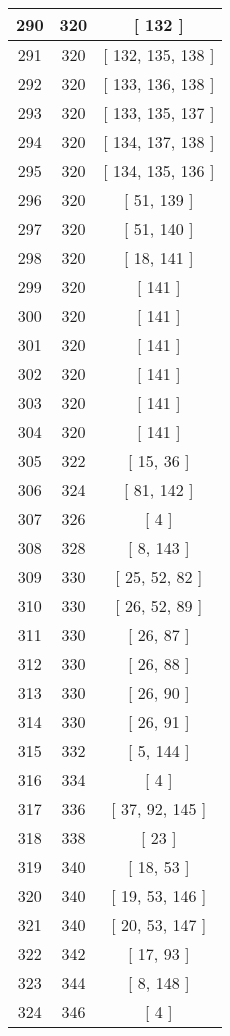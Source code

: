 \begin{center}
\begin{longtable}[H]{|| c c c ||}
\hline
290 & 320 & [ 132 ] \\ 
\hline
291 & 320 & [ 132, 135, 138 ] \\ 
\hline
292 & 320 & [ 133, 136, 138 ] \\ 
\hline
293 & 320 & [ 133, 135, 137 ] \\ 
\hline
294 & 320 & [ 134, 137, 138 ] \\ 
\hline
295 & 320 & [ 134, 135, 136 ] \\ 
\hline
296 & 320 & [ 51, 139 ] \\ 
\hline
297 & 320 & [ 51, 140 ] \\ 
\hline
298 & 320 & [ 18, 141 ] \\ 
\hline
299 & 320 & [ 141 ] \\ 
\hline
300 & 320 & [ 141 ] \\ 
\hline
301 & 320 & [ 141 ] \\ 
\hline
302 & 320 & [ 141 ] \\ 
\hline
303 & 320 & [ 141 ] \\ 
\hline
304 & 320 & [ 141 ] \\ 
\hline
305 & 322 & [ 15, 36 ] \\ 
\hline
306 & 324 & [ 81, 142 ] \\ 
\hline
307 & 326 & [ 4 ] \\ 
\hline
308 & 328 & [ 8, 143 ] \\ 
\hline
309 & 330 & [ 25, 52, 82 ] \\ 
\hline
310 & 330 & [ 26, 52, 89 ] \\ 
\hline
311 & 330 & [ 26, 87 ] \\ 
\hline
312 & 330 & [ 26, 88 ] \\ 
\hline
313 & 330 & [ 26, 90 ] \\ 
\hline
314 & 330 & [ 26, 91 ] \\ 
\hline
315 & 332 & [ 5, 144 ] \\ 
\hline
316 & 334 & [ 4 ] \\ 
\hline
317 & 336 & [ 37, 92, 145 ] \\ 
\hline
318 & 338 & [ 23 ] \\ 
\hline
319 & 340 & [ 18, 53 ] \\ 
\hline
320 & 340 & [ 19, 53, 146 ] \\ 
\hline
321 & 340 & [ 20, 53, 147 ] \\ 
\hline
322 & 342 & [ 17, 93 ] \\ 
\hline
323 & 344 & [ 8, 148 ] \\ 
\hline
324 & 346 & [ 4 ] \\ 

\end{longtable}
\end{center}
